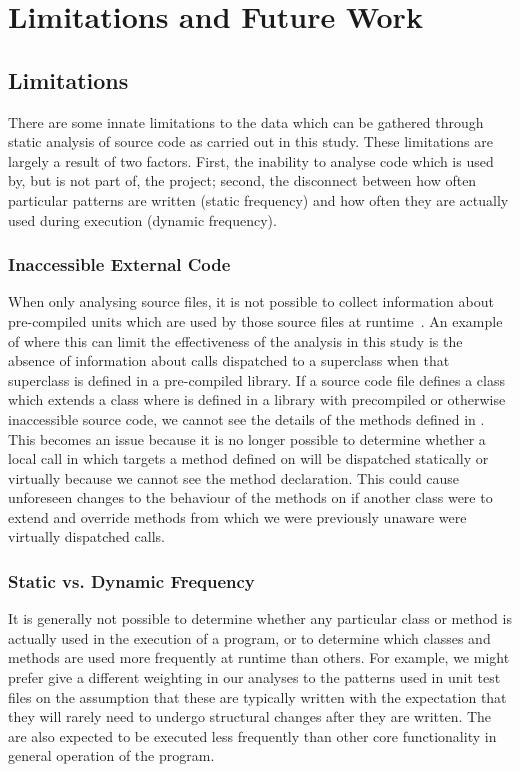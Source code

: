 \chapter{Limitations and Future Work}\label{C:future}

\section{Limitations}
There are some innate limitations to the data which can be gathered through static analysis of source code as carried out in this study. These limitations are largely a result of two factors. First, the inability to analyse code which is used by, but is not part of, the project; second, the disconnect between how often particular patterns are written (static frequency) and how often they are actually used during execution (dynamic frequency).

\subsection{Inaccessible External Code}
\label{InaccessibleCode}
When only analysing source files, it is not possible to collect information about pre-compiled units which are used by those source files at runtime~\cite{StaticAnalysisLimits}. An example of where this can limit the effectiveness of the analysis in this study is the absence of information about calls dispatched to a superclass when that superclass is defined in a pre-compiled library. If a source code file defines a class  which extends a class  where  is defined in a library with precompiled or otherwise inaccessible source code, we cannot see the details of the methods defined in . This becomes an issue because it is no longer possible to determine whether a local call in  which targets a method defined on  will be dispatched statically or virtually because we cannot see the method declaration. This could cause unforeseen changes to the behaviour of the methods on  if another class  were to extend  and override methods from  which we were previously unaware were virtually dispatched calls.

\subsection{Static vs. Dynamic Frequency}
It is generally not possible to determine whether any particular class or method is actually used in the execution of a program, or to determine which classes and methods are used more frequently at runtime than others. For example, we might prefer give a different weighting in our analyses to the patterns used in unit test files on the assumption that these are typically written with the expectation that they will rarely need to undergo structural changes after they are written. The are also expected to be executed less frequently than other core functionality in general operation of the program.

